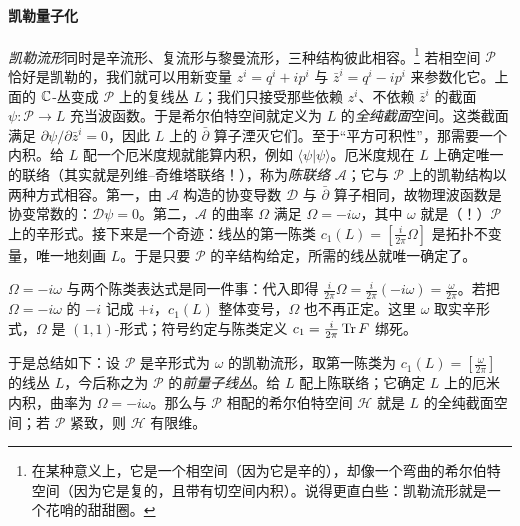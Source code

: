 \paragraph{凯勒量子化}
\textit{凯勒流形}同时是辛流形、复流形与黎曼流形，三种结构彼此相容。\footnote{在某种意义上，它是一个相空间（因为它是辛的），却像一个弯曲的希尔伯特空间（因为它是复的，且带有切空间内积）。说得更直白些：凯勒流形就是一个花哨的甜甜圈。}
若相空间 $\mathcal{P}$ 恰好是凯勒的，我们就可以用新变量 $z^i=q^i+ip^i$ 与 $\bar z^i=q^i-ip^i$ 来参数化它。上面的 $\mathbb{C}$-丛变成 $\mathcal{P}$ 上的复线丛 $L$；我们只接受那些依赖 $z^i$、不依赖 $\bar z^i$ 的截面 $\psi\colon\mathcal{P}\to L$ 充当波函数。于是希尔伯特空间就定义为 $L$ 的\textit{全纯截面}空间。这类截面满足 $\partial\psi/\partial\bar z^i=0$，因此 $L$ 上的 $\bar\partial$ 算子湮灭它们。至于“平方可积性”，那需要一个内积。给 $L$ 配一个厄米度规就能算内积，例如 $\langle\psi|\psi\rangle$。厄米度规在 $L$ 上确定唯一的联络（其实就是列维--奇维塔联络！），称为\textit{陈联络} $\mathcal{A}$；它与 $\mathcal{P}$ 上的凯勒结构以两种方式相容。第一，由 $\mathcal{A}$ 构造的协变导数 $\mathcal{D}$ 与 $\bar\partial$ 算子相同，故物理波函数是协变常数的：$\mathcal{D}\psi=0$。第二，$\mathcal{A}$ 的曲率 $\Omega$ 满足 $\Omega=-i\omega$，其中 $\omega$ 就是（！）$\mathcal{P}$ 上的辛形式。接下来是一个奇迹：线丛的第一陈类 $c_1(L)=[\frac{i}{2\pi}\Omega]$ 是拓扑不变量，唯一地刻画 $L$。于是只要 $\mathcal{P}$ 的辛结构给定，所需的线丛就唯一确定了。

\begin{yizhu}[易错点]
$\Omega=-i\omega$ 与两个陈类表达式是同一件事：代入即得 $\frac{i}{2\pi}\Omega=\frac{i}{2\pi}(-i\omega)=\frac{\omega}{2\pi}$。若把 $\Omega=-i\omega$ 的 $-i$ 记成 $+i$，$c_1(L)$ 整体变号，$\Omega$ 也不再正定。这里 $\omega$ 取实辛形式，$\Omega$ 是 $(1,1)$-形式；符号约定与陈类定义 $c_1=\frac{i}{2\pi}\operatorname{Tr} F$ 绑死。
\end{yizhu}

于是总结如下：设 $\mathcal{P}$ 是辛形式为 $\omega$ 的凯勒流形，取第一陈类为 $c_1(L)=[\frac{\omega}{2\pi}]$ 的线丛 $L$，今后称之为 $\mathcal{P}$ 的\textit{前量子线丛}。给 $L$ 配上陈联络；它确定 $L$ 上的厄米内积，曲率为 $\Omega=-i\omega$。那么与 $\mathcal{P}$ 相配的希尔伯特空间 $\mathcal{H}$ 就是 $L$ 的全纯截面空间；若 $\mathcal{P}$ 紧致，则 $\mathcal{H}$ 有限维。

